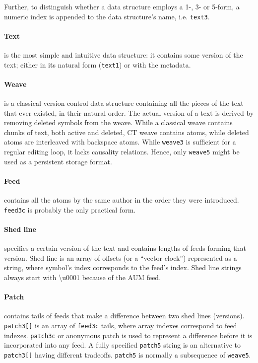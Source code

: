 \documentclass{acm_proc_article-sp}
\begin{document}
Further, to distinguish whether a data structure employs a 1-, 3- or 5-form, a numeric index is appended to the data structure's name, i.e. {\tt text3}.

\paragraph{Text} is the most simple and intuitive data structure: it contains some version of the text; either in its natural form ({\tt text1}) or with the metadata.
\paragraph{Weave} is a classical version control data structure containing all the pieces of the
   text that ever existed, in their natural order. The actual version
   of a text is derived by removing deleted symbols from the weave.
   While a classical weave contains chunks of text, both active and
   deleted, CT weave contains atoms, while deleted atoms are interleaved
   with backspace atoms.
   While {\tt weave3} is sufficient for a regular editing loop, 
   it lacks causality relations. Hence, only {\tt weave5} might
   be used as a persistent storage format.
\paragraph{Feed} contains all the atoms by the same author in the order they were introduced. {\tt feed3c} is probably the only practical form.
\paragraph{Shed line} specifies a certain version of the text and contains lengths of feeds forming that version. Shed line is an array of offsets (or a ``vector clock'') represented as a string, where symbol's index corresponds to the feed's index. Shed line strings always start with \textbackslash u0001 because of the AUM feed.
\paragraph{Patch} contains tails of feeds that make a difference between two shed lines (versions). {\tt patch3[]} is an array of {\tt feed3c} tails, where array indexes correspond to feed indexes. {\tt patch3c} or anonymous patch is used to represent a difference before it is incorporated into any feed. A fully specified {\tt patch5} string is an alternative to {\tt patch3[]} having different tradeoffs.
{\tt patch5} is normally a subsequence of {\tt weave5}.
\end{document}
